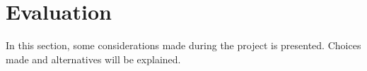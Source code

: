 \section{Evaluation}
\label{sec:evaluation}

In this section, some considerations made during the project is presented. Choices made and alternatives will be explained.















